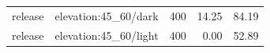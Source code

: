 \begin{longtable}{l>{\raggedright\arraybackslash}p{.42\linewidth}rrr}
release & %
elevation:45\_\allowbreak{}60/dark & %
400 & %
14.25 & %
84.19 \\ %

release & %
elevation:45\_\allowbreak{}60/light & %
400 & %
0.00 & %
52.89 \\ %


\end{longtable}
